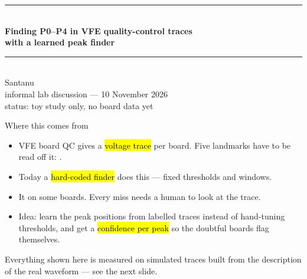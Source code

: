 



{
\begin{frame}[plain]
  \vspace*{1.2cm}
  \begin{center}
    {\color{cmsaccent}\rule{0.6\linewidth}{1.5pt}}\\[10pt]
    {\Large\bfseries\color{white} Finding P0--P4 in VFE quality-control traces}\\[6pt]
    {\Large\bfseries\color{white} with a learned peak finder}\\[10pt]
    {\color{cmsaccent}\rule{0.6\linewidth}{1.5pt}}\\[20pt]
    {\large\color{white} Santanu}\\[10pt]
    {\footnotesize\color{cmsgold} informal lab discussion --- 10 November 2026}\\[6pt]
    {\footnotesize\color{lightgrey} status: toy study only, no board data yet}
  \end{center}
\end{frame}
}

\begin{frame}{Where this comes from}
  \begin{itemize}
    \item VFE board QC gives a \hl{voltage trace} per board. Five landmarks have
          to be read off it: .
    \item Today a \hl{hard-coded finder} does this --- fixed thresholds and
          windows.
    \item It  on some boards. Every miss needs a human
          to look at the trace.
    \item Idea: learn the peak positions from labelled traces instead of
          hand-tuning thresholds, and get a \hl{confidence per peak} so the
          doubtful boards flag themselves.
  \end{itemize}
  \vfill
  {\tiny\color{lightgrey} Everything shown here is measured on simulated traces built from the
   description of the real waveform --- see the next slide.}
\end{frame}

